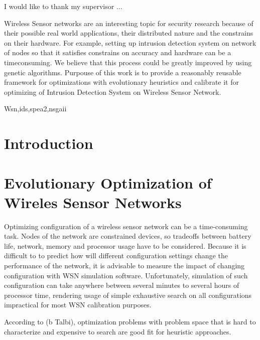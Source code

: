 \documentclass[12pt,oneside,draft]{fithesis2}
\begin{document}
\FrontMatter
\ThesisTitlePage
\begin{ThesisDeclaration}
\DeclarationText
\AdvisorName
\end{ThesisDeclaration}
\begin{ThesisThanks}
I would like to thank my supervisor ...
\end{ThesisThanks}
\begin{ThesisAbstract}
\end{ThesisAbstract}
Wireless Sensor networks are an interesting topic for security research because of their possible real world applications, their distributed nature and the constrains on their hardware. For example, setting up intrusion detection system on network of nodes so that it satisfies constrains on accuracy and hardware can be a timeconsuming.
We believe that this process could be greatly improved by using genetic algorithms.
Purpouse  of this work is to provide a reasonably reusable framework for optimizations with evolutionary heuristics and calibrate it for optimizing of Intrusion Detection System on Wireless Sensor Network. 
\begin{ThesisKeyWords}
Wsn,ids,spea2,nsgaii
\end{ThesisKeyWords}

\tableofcontents %

\MainMatter
\chapter{Introduction}


\chapter{Evolutionary Optimization of Wireles Sensor Networks}


Optimizing configuration of a wireless sensor network can be a time-consuming task. Nodes of the network are constrained devices,
so tradeoffs between battery life, network, memory and processor usage have to be considered. Because it is difficult to to predict how will different configuration settings change the performance of the network, it is advisable to measure the impact of changing configuration with WSN simulation software. Unfortunately, simulation of such configuration can take anywhere between several minutes to several hours of processor time, rendering usage of simple exhaustive search on all configurations impractical for most WSN calibration purposes.

According to (b Talbi), optimization problems with problem space that is hard to characterize and expensive to search are good fit for heuristic approaches.
\end{document}
